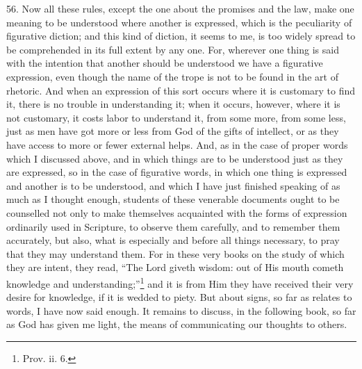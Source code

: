 56. Now all these rules, except the one about the promises and the law, make one meaning to be understood where another is expressed, which is the peculiarity of figurative diction; and this kind of diction, it seems to me, is too widely spread to be comprehended in its full extent by any one. For, wherever one thing is said with the intention that another should be understood we have a figurative expression, even though the name of the trope is not to be found in the art of rhetoric. And when an expression of this sort occurs where it is customary to find it, there is no trouble in understanding it; when it occurs, however, where it is not customary, it costs labor to understand it, from some more, from some less, just as men have got more or less from God of the gifts of intellect, or as they have access to more or fewer external helps. And, as in the case of proper words which I discussed above, and in which things are to be understood just as they are expressed, so in the case of figurative words, in which one thing is expressed and another is to be understood, and which I have just finished speaking of as much as I thought enough, students of these venerable documents ought to be counselled not only to make themselves acquainted with the forms of expression ordinarily used in Scripture, to observe them carefully, and to remember them accurately, but also, what is especially and before all things necessary, to pray that they may understand them. For in these very books on the study of which they are intent, they read, “The Lord giveth wisdom: out of His mouth cometh knowledge and understanding;”\footnote{Prov. ii. 6.} and it is from Him they have received their very desire for knowledge, if it is wedded to piety. But about signs, so far as relates to words, I have now said enough. It remains to discuss, in the following book, so far as God has given me light, the means of communicating our thoughts to others.


